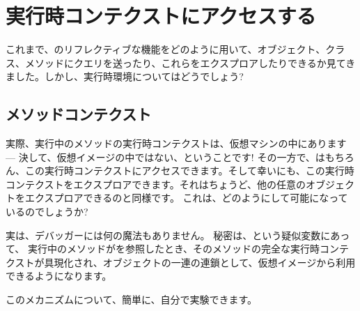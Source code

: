 \documentclass[a4paper,10pt,twoside]{book}
\begin{document}
\section{実行時コンテクストにアクセスする}

これまで、\st{}のリフレクティブな機能をどのように用いて、オブジェクト、クラス、メソッドにクエリを送ったり、これらをエクスプロアしたりできるか見てきました。しかし、実行時環境についてはどうでしょう?

\subsection{メソッドコンテクスト}

実際、実行中のメソッドの実行時コンテクストは、仮想マシンの中にあります --- 決して、仮想イメージの中ではない、ということです!
その一方で、はもちろん、この実行時コンテクストにアクセスできます。そして幸いにも、この実行時コンテクストをエクスプロアできます。それはちょうど、他の任意のオブジェクトをエクスプロアできるのと同様です。
これは、どのようにして可能になっているのでしょうか?

実は、デバッガーには何の魔法もありません。
秘密は、という疑似変数にあって、%
実行中のメソッドがを参照したとき、そのメソッドの完全な実行時コンテクストが具現化され、オブジェクトの一連の連鎖として、仮想イメージから利用できるようになります。

このメカニズムについて、簡単に、自分で実験できます。
\end{document}
